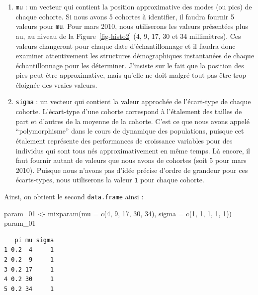 \documentclass[
  a4paper,
  DIV=11,
  numbers=noendperiod,
  oneside]{scrreprt}
\newenvironment{Shaded}{}{}
\newcommand{\AttributeTok}[1]{\textcolor[rgb]{0.84,0.23,0.29}{#1}}
\newcommand{\DecValTok}[1]{\textcolor[rgb]{0.00,0.36,0.77}{#1}}
\newcommand{\FunctionTok}[1]{\textcolor[rgb]{0.44,0.26,0.76}{#1}}
\newcommand{\NormalTok}[1]{\textcolor[rgb]{0.14,0.16,0.18}{#1}}
\newcommand{\OtherTok}[1]{\textcolor[rgb]{0.44,0.26,0.76}{#1}}
\providecommand{\tightlist}{%
  \setlength{\itemsep}{0pt}\setlength{\parskip}{0pt}}\usepackage{longtable,booktabs,array}
\begin{document}
\begin{enumerate}
\def\labelenumi{\arabic{enumi}.}
\tightlist
\item
  \texttt{mu} : un vecteur qui contient la position approximative des
  modes (ou pics) de chaque cohorte. Si nous avons 5 cohortes à
  identifier, il faudra fournir 5 valeurs pour \texttt{mu}. Pour mars
  2010, nous utiliserons les valeurs présentées plus au, au niveau de la
  Figure~\ref{fig-histo2} (4, 9, 17, 30 et 34 millimètres). Ces valeurs
  changeront pour chaque date d'échantillonnage et il faudra donc
  examiner attentivement les structures démographiques instantanées de
  chaque échantillonnage pour les déterminer. J'insiste sur le fait que
  la position des pics peut être approximative, mais qu'elle ne doit
  malgré tout pas être trop éloignée des vraies valeurs.
\item
  \texttt{sigma} : un vecteur qui contient la valeur approchée de
  l'écart-type de chaque cohorte. L'écart-type d'une cohorte correspond
  à l'étalement des tailles de part et d'autres de la moyenne de la
  cohorte. C'est ce que nous avons appelé ``polymorphisme'' dans le
  cours de dynamique des populations, puisque cet étalement représente
  des performances de croissance variables pour des individus qui sont
  tous nés approximativement en même temps. Là encore, il faut fournir
  autant de valeurs que nous avons de cohortes (soit 5 pour mars 2010).
  Puisque nous n'avons pas d'idée précise d'ordre de grandeur pour ces
  écarts-types, nous utiliserons la valeur \texttt{1} pour chaque
  cohorte.
\end{enumerate}

Ainsi, on obtient le second \texttt{data.frame} ainsi :

\begin{Shaded}
\begin{Highlighting}[]
\NormalTok{param\_01 }\OtherTok{\textless{}{-}} \FunctionTok{mixparam}\NormalTok{(}\AttributeTok{mu =} \FunctionTok{c}\NormalTok{(}\DecValTok{4}\NormalTok{, }\DecValTok{9}\NormalTok{, }\DecValTok{17}\NormalTok{, }\DecValTok{30}\NormalTok{, }\DecValTok{34}\NormalTok{),}
                     \AttributeTok{sigma =} \FunctionTok{c}\NormalTok{(}\DecValTok{1}\NormalTok{, }\DecValTok{1}\NormalTok{, }\DecValTok{1}\NormalTok{, }\DecValTok{1}\NormalTok{, }\DecValTok{1}\NormalTok{))}
\NormalTok{param\_01}
\end{Highlighting}
\end{Shaded}

\begin{verbatim}
   pi mu sigma
1 0.2  4     1
2 0.2  9     1
3 0.2 17     1
4 0.2 30     1
5 0.2 34     1
\end{verbatim}
\end{document}
